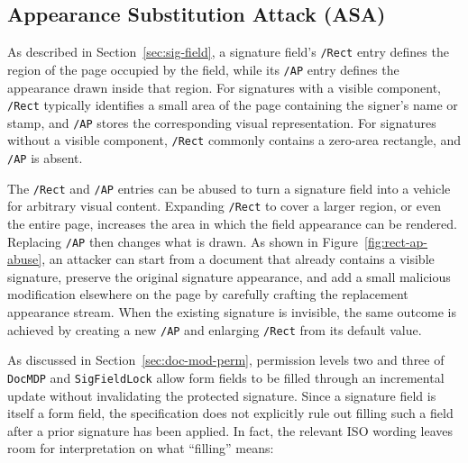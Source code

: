 \documentclass[12pt]{article}
\begin{document}
\subsection{Appearance Substitution Attack (ASA)}


As described in Section~\ref{sec:sig-field}, a signature field's \texttt{/Rect} entry defines the region of the page occupied by the field, while its \texttt{/AP} entry defines the appearance drawn inside that region. For signatures with a visible component, \texttt{/Rect} typically identifies a small area of the page containing the signer's name or stamp, and \texttt{/AP} stores the corresponding visual representation. For signatures without a visible component, \texttt{/Rect} commonly contains a zero-area rectangle, and \texttt{/AP} is absent.

The \texttt{/Rect} and \texttt{/AP} entries can be abused to turn a signature field into a vehicle for arbitrary visual content. Expanding \texttt{/Rect} to cover a larger region, or even the entire page, increases the area in which the field appearance can be rendered. Replacing \texttt{/AP} then changes what is drawn. As shown in Figure~\ref{fig:rect-ap-abuse}, an attacker can start from a document that already contains a visible signature, preserve the original signature appearance, and add a small malicious modification elsewhere on the page by carefully crafting the replacement appearance stream. When the existing signature is invisible, the same outcome is achieved by creating a new \texttt{/AP} and enlarging \texttt{/Rect} from its default value.

As discussed in Section~\ref{sec:doc-mod-perm}, permission levels two and three of \texttt{DocMDP} and \texttt{SigFieldLock} allow form fields to be filled through an incremental update without invalidating the protected signature. Since a signature field is itself a form field, the specification does not explicitly rule out filling such a field after a prior signature has been applied. In fact, the relevant ISO wording leaves room for interpretation on what ``filling'' means:
\end{document}
